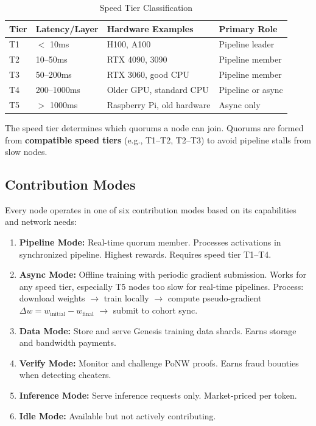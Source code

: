 \documentclass[11pt,a4paper]{article}
\begin{document}
\begin{table}[H]
\centering
\caption{Speed Tier Classification}
\begin{tabular}{@{}llll@{}}
\toprule
\textbf{Tier} & \textbf{Latency/Layer} & \textbf{Hardware Examples} & \textbf{Primary Role} \\
\midrule
T1 & $<$ 10ms & H100, A100 & Pipeline leader \\
T2 & 10--50ms & RTX 4090, 3090 & Pipeline member \\
T3 & 50--200ms & RTX 3060, good CPU & Pipeline member \\
T4 & 200--1000ms & Older GPU, standard CPU & Pipeline or async \\
T5 & $>$ 1000ms & Raspberry Pi, old hardware & Async only \\
\bottomrule
\end{tabular}
\end{table}

The speed tier determines which quorums a node can join. Quorums are formed from \textbf{compatible speed tiers} (e.g., T1--T2, T2--T3) to avoid pipeline stalls from slow nodes.

\subsection{Contribution Modes}

Every node operates in one of six contribution modes based on its capabilities and network needs:

\begin{enumerate}
    \item \textbf{Pipeline Mode:} Real-time quorum member. Processes activations in synchronized pipeline. Highest rewards. Requires speed tier T1--T4.
    \item \textbf{Async Mode:} Offline training with periodic gradient submission. Works for any speed tier, especially T5 nodes too slow for real-time pipelines. Process: download weights $\rightarrow$ train locally $\rightarrow$ compute pseudo-gradient $\Delta w = w_{\text{initial}} - w_{\text{final}}$ $\rightarrow$ submit to cohort sync.
    \item \textbf{Data Mode:} Store and serve Genesis training data shards. Earns storage and bandwidth payments.
    \item \textbf{Verify Mode:} Monitor and challenge PoNW proofs. Earns fraud bounties when detecting cheaters.
    \item \textbf{Inference Mode:} Serve inference requests only. Market-priced per token.
    \item \textbf{Idle Mode:} Available but not actively contributing.
\end{enumerate}
\end{document}
